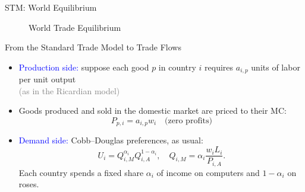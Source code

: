 \documentclass[notes,11pt, aspectratio=169, xcolor=table]{beamer}
\newcommand{\blue}[1]{\textcolor{blue}{#1}}
\begin{document}
\begin{frame}{STM: World Equilibrium}
\begin{figure}
        \caption{World Trade Equilibrium}
    \label{fig: trade-eqm}
\end{figure}

\end{frame}




\begin{frame}{From the Standard Trade Model to Trade Flows}
\small
\begin{itemize}
    \item \blue{Production side:} suppose each good $p$ in country $i$ requires $a_{i,p}$ units of labor per unit output \\
    \textcolor{gray}{(as in the Ricardian model)}

    \item<2-> Goods produced and sold in the domestic market are priced to their MC:
          \[
          P_{p,i} = a_{i,p} w_i \quad \text{(zero profits)}
          \]
    \item<3-> \blue{Demand side:} Cobb--Douglas preferences, as usual:
          \[
          U_i = Q_{i,M}^{\alpha_i} Q_{i,A}^{1-\alpha_i}, 
          \quad Q_{i,M} = \alpha_i \frac{w_iL_i}{P_{i,A}}.
          \]
          Each country spends a fixed share $\alpha_i$ of income on computers and $1-\alpha_i$ on roses.

\end{itemize}
\end{frame}
\end{document}
